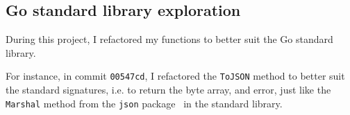 \subsection{Go standard library exploration}

During this project,
I refactored my functions to better suit
the Go standard library.

For instance,
in commit \texttt{00547cd},
I refactored the \texttt{ToJSON} method
to better suit the standard signatures,
i.e. to return the byte array, and error,
just like the \texttt{Marshal} method
from the \texttt{json} package~\cite{cox_json_2022}
in the standard library.

